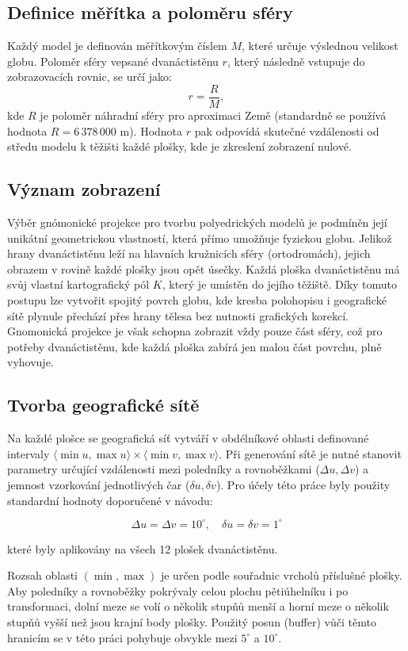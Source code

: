 \documentclass[12pt, a4paper]{article}
\begin{document}
\subsection{Definice měřítka a poloměru sféry}
Každý model je definován měřítkovým číslem $M$, které určuje výslednou velikost globu. Poloměr sféry vepsané dvanáctistěnu $r$, který následně vstupuje do zobrazovacích rovnic, se určí jako:
\[ r = \frac{R}{M}, \]
kde $R$ je poloměr náhradní sféry pro aproximaci Země (standardně se používá hodnota $R = 6\,378\,000$ m). Hodnota $r$ pak odpovídá skutečné vzdálenosti od středu modelu k těžišti každé plošky, kde je zkreslení zobrazení nulové.

\subsection{Význam zobrazení}
Výběr gnómonické projekce pro tvorbu polyedrických modelů je podmíněn její unikátní geometrickou vlastností, která přímo umožňuje fyzickou globu. Jelikož hrany dvanáctistěnu leží na hlavních kružnicích sféry (ortodromách), jejich obrazem v rovině každé plošky jsou opět úsečky. Každá ploška dvanáctistěnu má svůj vlastní kartografický pól $K$, který je umístěn do jejího těžiště. Díky tomuto postupu lze vytvořit spojitý povrch globu, kde kresba polohopisu i geografické sítě plynule přechází přes hrany tělesa bez nutnosti grafických korekcí. Gnomonická projekce je však schopna zobrazit vždy pouze část sféry, což pro potřeby dvanáctistěnu, kde každá ploška zabírá jen malou část povrchu, plně vyhovuje.

\subsection{Tvorba geografické sítě}
Na každé plošce se geografická síť vytváří v obdélníkové oblasti definované intervaly $\langle \min u, \max u \rangle \times \langle \min v, \max v \rangle$. Při generování sítě je nutné stanovit parametry určující vzdálenosti mezi poledníky a rovnoběžkami ($\Delta u, \Delta v$) a jemnost vzorkování jednotlivých čar ($\delta u, \delta v$). Pro účely této práce byly použity standardní hodnoty doporučené v návodu:

\[\Delta u = \Delta v = 10^\circ, \quad \delta u = \delta v = 1^\circ\]

které byly aplikovány na všech 12 plošek dvanáctistěnu.

Rozsah oblasti $(\min, \max)$ je určen podle souřadnic vrcholů příslušné plošky. Aby poledníky a rovnoběžky pokrývaly celou plochu pětiúhelníku i po transformaci, dolní meze se volí o několik stupňů menší a horní meze o několik stupňů vyšší než jsou krajní body plošky. Použitý posun (buffer) vůči těmto hranicím se v této práci pohybuje obvykle mezi $5^\circ$ a $10^\circ$.
\end{document}

